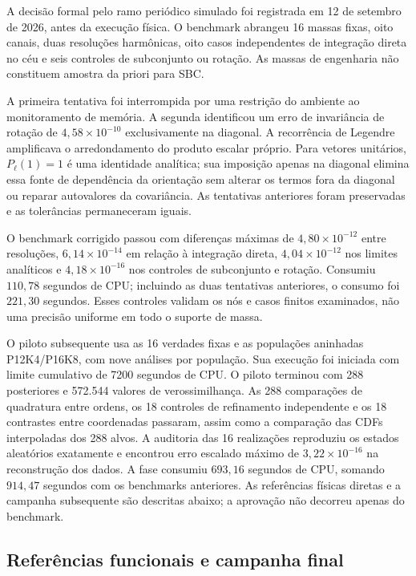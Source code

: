 A decisão formal pelo ramo periódico simulado foi registrada em 12 de setembro de 2026, antes da execução física. O benchmark abrangeu 16 massas fixas, oito canais, duas resoluções harmônicas, oito casos independentes de integração direta no céu e seis controles de subconjunto ou rotação. As massas de engenharia não constituem amostra da priori para SBC.

A primeira tentativa foi interrompida por uma restrição do ambiente ao monitoramento de memória. A segunda identificou um erro de invariância de rotação de $4{,}58\times10^{-10}$ exclusivamente na diagonal. A recorrência de Legendre amplificava o arredondamento do produto escalar próprio. Para vetores unitários, $P_\ell(1)=1$ é uma identidade analítica; sua imposição apenas na diagonal elimina essa fonte de dependência da orientação sem alterar os termos fora da diagonal ou reparar autovalores da covariância. As tentativas anteriores foram preservadas e as tolerâncias permaneceram iguais.

O benchmark corrigido passou com diferenças máximas de $4{,}80\times10^{-12}$ entre resoluções, $6{,}14\times10^{-14}$ em relação à integração direta, $4{,}04\times10^{-12}$ nos limites analíticos e $4{,}18\times10^{-16}$ nos controles de subconjunto e rotação. Consumiu $110{,}78$ segundos de CPU; incluindo as duas tentativas anteriores, o consumo foi $221{,}30$ segundos. Esses controles validam os nós e casos finitos examinados, não uma precisão uniforme em todo o suporte de massa.

O piloto subsequente usa as 16 verdades fixas e as populações aninhadas P12K4/P16K8, com nove análises por população. Sua execução foi iniciada com limite cumulativo de 7200 segundos de CPU. O piloto terminou com 288 posteriores e 572.544 valores de verossimilhança. As 288 comparações de quadratura entre ordens, os 18 controles de refinamento independente e os 18 contrastes entre coordenadas passaram, assim como a comparação das CDFs interpoladas dos 288 alvos. A auditoria das 16 realizações reproduziu os estados aleatórios exatamente e encontrou erro escalado máximo de $3{,}22\times10^{-16}$ na reconstrução dos dados. A fase consumiu $693{,}16$ segundos de CPU, somando $914{,}47$ segundos com os benchmarks anteriores. As referências físicas diretas e a campanha subsequente são descritas abaixo; a aprovação não decorreu apenas do benchmark.


\subsection{Referências funcionais e campanha final}

